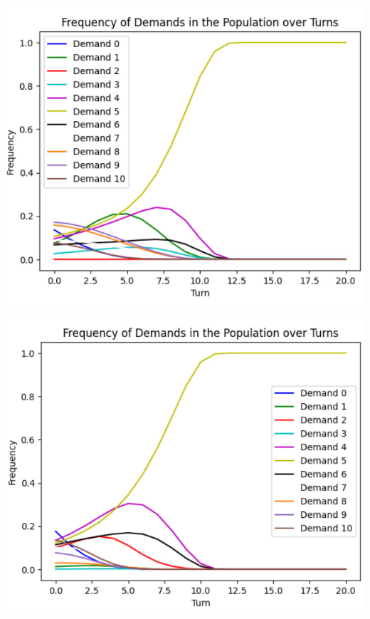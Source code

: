 \begin{center}
	\includegraphics{12}
\end{center}

\begin{center}
	\includegraphics{13}
\end{center}

